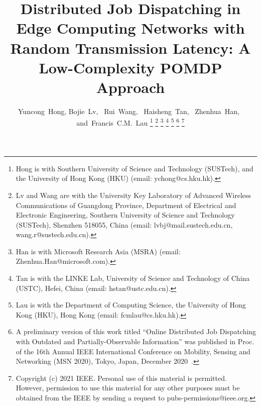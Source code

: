 \documentclass[journal]{IEEEtran} %
\theoremstyle{definition}             %
\theoremstyle{remark}                 %
\theoremstyle{plain}                  %
\begin{document}
    \title{Distributed Job Dispatching in Edge Computing Networks with Random Transmission Latency: A Low-Complexity POMDP Approach
    }
    
    \author{
        Yuncong~Hong,
        Bojie~Lv,~
        Rui~Wang,~
        Haisheng~Tan,~
        Zhenhua~Han,~
        and~Francis~C.M.~Lau%
        \thanks{
          Hong is with Southern University of Science and Technology (SUSTech), and the University of Hong Kong (HKU) (email: ychong@cs.hku.hk).
        }
        \thanks{
          Lv and Wang are with the University Key Laboratory of Advanced Wireless Communications of Guangdong Province, Department of Electrical and Electronic Engineering, Southern University of Science and Technology (SUSTech), Shenzhen 518055, China (email: lvbj@mail.sustech.edu.cn, wang.r@sustech.edu.cn).
        }
        \thanks{
          Han is with Microsoft Research Asia (MSRA) (email: Zhenhua.Han@microsoft.com).
        }%
        \thanks{
          Tan is with the LINKE Lab,  University of Science and Technology of China (USTC), Hefei, China (email: hstan@ustc.edu.cn).
        }%
        \thanks{
          Lau is with the Department of Computing Science, the University of Hong Kong (HKU), Hong Kong (email: fcmlau@cs.hku.hk).
        }%
        \thanks{
          A preliminary version of this work titled ``Online Distributed Job Dispatching with Outdated and Partially-Observable Information'' was published in Proc. of the 16th Annual IEEE International Conference on Mobility, Sensing and Networking (MSN 2020), Tokyo, Japan, December 2020~\cite{msn2020}.
        }%
        \thanks{{
          Copyright (c) 2021 IEEE. Personal use of this material is permitted. However, permission to use this material for any other purposes must be obtained from the IEEE by sending a request to pubs-permissions@ieee.org.
        }}%
    }%

    \maketitle
    

    

    
    

    
    
    
\end{document}

